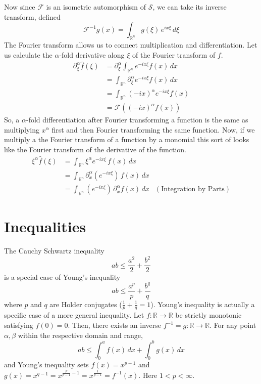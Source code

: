 \documentclass{article}
\theoremstyle{remark}
\theoremstyle{definition}
\begin{document}
Now since $\mathcal{F}$ is an isometric automorphism of $\mathcal{S}$, we can take its inverse transform, defined 
\[\mathcal{F}^{-1} g(x) = \int_{\mathbb{R}^n} g(\xi) \, e^{i x \xi} \, d\xi\]
The Fourier transform allows us to connect multiplication and differentiation. Let us calculate the $\alpha$-fold derivative along $\xi$ of the Fourier transform of $f$. 
\begin{align*}
    \partial_\xi^\alpha \hat{f}(\xi) & = \partial_\xi^\alpha \int_{\mathbb{R}^n} e^{-i x \xi} f(x)\,dx \\
    & = \int_{\mathbb{R}^n} \partial_\xi^\alpha e^{-i x \xi} f(x)\,dx \\
    & = \int_{\mathbb{R}^n} (-i x)^\alpha e^{-i x \xi} f(x) \\
    & = \mathcal{F}((-ix)^\alpha f(x)) 
\end{align*}
So, a $\alpha$-fold differentiation after Fourier transforming a function is the same as multiplying $x^\alpha$ first and then Fourier transforming the same function. Now, if we multiply a the Fourier transform of a function by a monomial this sort of looks like the Fourier transform of the derivative of the function. 
\begin{align*}
    \xi^\alpha \hat{f}(\xi) & = \int_{\mathbb{R}^n} \xi^\alpha e^{-i x \xi} \, f(x) \, dx \\
    & = \int_{\mathbb{R}^n} \partial_x^\alpha (e^{-i x \xi}) \, f(x)\, dx \\
    & = \int_{\mathbb{R}^n} (e^{-i x \xi}) \, \partial_x^\alpha f(x)\, dx & (\text{Integration by Parts})
\end{align*}

\section{Inequalities}

The Cauchy Schwartz inequality 
\[a b \leq \frac{a^2}{2} + \frac{b^2}{2}\]
is a special case of Young's inequality 
\[a b \leq \frac{a^p}{p} + \frac{b^q}{q}\]
where $p$ and $q$ are Holder conjugates ($\frac{1}{p} + \frac{1}{q} = 1$). Young's inequality is actually a specific case of a more general inequality. Let $f: \mathbb{R} \to \mathbb{R}$ be strictly monotonic satisfying $f(0) = 0$. Then, there exists an inverse $f^{-1} = g: \mathbb{R} \to \mathbb{R}$. For any point $\alpha, \beta$ within the respective domain and range, 
\[a b \leq \int_0^a f(x)\, dx + \int_0^b g(x) \, dx\]
and Young's inequality sets $f(x) = x^{p-1}$ and $g(x) = x^{q-1} = x^{\frac{p}{p-1} - 1} = x^{\frac{1}{p-1}} = f^{-1} (x)$. Here $1 < p < \infty$. 
\end{document}
